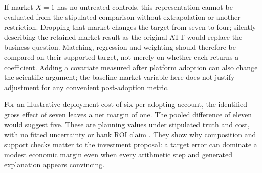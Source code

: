 If market $X=1$ has no untreated controls, this representation cannot be
evaluated from the stipulated comparison without extrapolation or another
restriction. Dropping that market changes the target from seven to four;
silently describing the retained-market result as the original ATT would
replace the business question. Matching, regression and weighting should
therefore be compared on their supported target, not merely on whether each
returns a coefficient. Adding a covariate measured after platform adoption
can also change the scientific argument; the baseline market variable here
does not justify adjustment for any convenient post-adoption metric.

For an illustrative deployment cost of six per adopting account, the
identified gross effect of seven leaves a net margin of one. The pooled
difference of eleven would suggest five. These are planning values under
stipulated truth and cost, with no fitted uncertainty or bank ROI claim
\citep{exec14_workflow_remainder}. They show why composition and support checks
matter to the investment proposal: a target error can dominate a modest
economic margin even when every arithmetic step and generated explanation
appears convincing.
\label{exec14:l5-depth-end}
